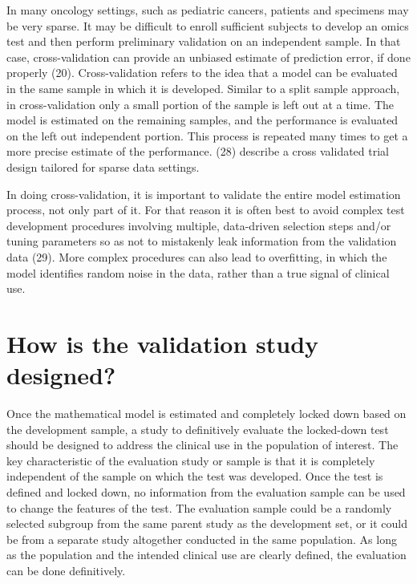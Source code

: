 \documentclass[11pt]{article}
\begin{document}
In many oncology settings, such as pediatric cancers, patients and
specimens may be very sparse. It may be difficult to enroll sufficient
subjects to develop an omics test and then perform preliminary
validation on an independent sample. In that case, cross-validation can
provide an unbiased estimate of prediction error, if done properly (20).
Cross-validation refers to the idea that a model can be evaluated in the
same sample in which it is developed. Similar to a split sample
approach, in cross-validation only a small portion of the sample is left
out at a time. The model is estimated on the remaining samples, and the
performance is evaluated on the left out independent portion. This
process is repeated many times to get a more precise estimate of the
performance. (28) describe a cross validated trial design tailored for
sparse data settings.

In doing cross-validation, it is important to validate the entire model
estimation process, not only part of it. For that reason it is often
best to avoid complex test development procedures involving multiple,
data-driven selection steps and/or tuning parameters so as not to
mistakenly leak information from the validation data (29). More complex
procedures can also lead to overfitting, in which the model identifies
random noise in the data, rather than a true signal of clinical use.

\section{How is the validation study
designed?}\label{how-is-the-validation-study-designed}

Once the mathematical model is estimated and completely locked down
based on the development sample, a study to definitively evaluate the
locked-down test should be designed to address the clinical use in the
population of interest. The key characteristic of the evaluation study
or sample is that it is completely independent of the sample on which
the test was developed. Once the test is defined and locked down, no
information from the evaluation sample can be used to change the
features of the test. The evaluation sample could be a randomly selected
subgroup from the same parent study as the development set, or it could
be from a separate study altogether conducted in the same population. As
long as the population and the intended clinical use are clearly
defined, the evaluation can be done definitively.
\end{document}
